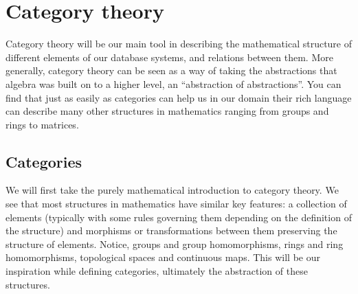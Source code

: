 \section{Category theory}
Category theory will be our main tool in describing the mathematical structure
of different elements of our database systems, and relations between them. More
generally, category theory can be seen as a way of taking the abstractions that
algebra was built on to a higher level, an ``abstraction of abstractions''. You
can find that just as easily as categories can help us in our domain their rich
language can describe many other structures in mathematics ranging from groups and rings to matrices. 
\subsection{Categories}
\theoremstyle{definition}\newtheorem*{categorydef}{Category}
We will first take the purely mathematical introduction to category theory. We see that most structures in mathematics have similar key features: a collection of elements (typically with some rules governing them depending on the definition of the structure) and morphisms or transformations between them preserving the structure of elements. Notice, groups and group homomorphisms, rings and ring homomorphisms, topological spaces and continuous maps. This will be our inspiration while defining categories, ultimately the abstraction of these structures. 
